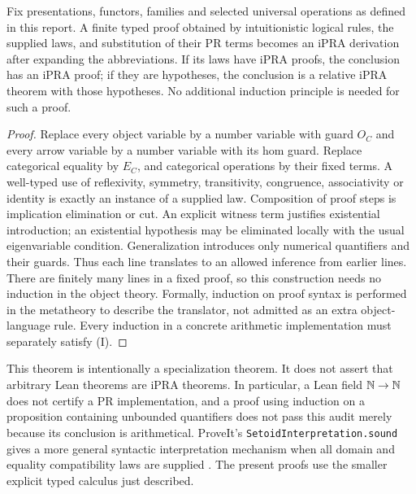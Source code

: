 \begin{theorem}\label{thm:export}
Fix presentations, functors, families and selected universal operations as
defined in this report. A finite typed proof obtained by intuitionistic
logical rules, the supplied laws, and substitution of their PR terms becomes
an iPRA derivation after expanding the abbreviations. If its laws have iPRA
proofs, the conclusion has an iPRA proof; if they are hypotheses, the
conclusion is a relative iPRA theorem with those hypotheses.
No additional induction principle is needed for such a proof.
\end{theorem}
\begin{proof}
Replace every object variable by a number variable with guard $O_C$ and
every arrow variable by a number variable with its hom guard. Replace
categorical equality by $E_C$, and categorical operations by their fixed
terms. A well-typed use of reflexivity, symmetry, transitivity, congruence,
associativity or identity is exactly an instance of a supplied law.
Composition of proof steps is implication elimination or cut. An explicit
witness term justifies existential introduction; an existential hypothesis
may be eliminated locally with the usual eigenvariable condition.
Generalization introduces only numerical quantifiers and their guards.
Thus each line translates to an allowed inference from earlier lines.
There are finitely many lines in a fixed proof, so this construction needs
no induction in the object theory. Formally, induction on proof syntax is
performed in the metatheory to describe the translator, not admitted as
an extra object-language rule. Every induction in a concrete arithmetic
implementation must separately satisfy (I).
\end{proof}

This theorem is intentionally a specialization theorem. It does not assert
that arbitrary Lean theorems are iPRA theorems. In particular, a Lean field
$\mathbb{N}\to\mathbb{N}$ does not certify a PR implementation, and a proof using induction
on a proposition containing unbounded quantifiers does not pass this audit
merely because its conclusion is arithmetical. ProveIt's
\texttt{SetoidInterpretation.sound} gives a more general syntactic
interpretation mechanism when all domain and equality compatibility laws
are supplied \cite{repo-setoid}. The present proofs use the smaller explicit
typed calculus just described.

